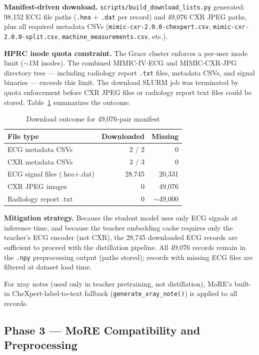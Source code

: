 \documentclass[sigconf,nonacm]{acmart}
\begin{document}
\textbf{Manifest-driven download.}
\texttt{scripts/build\_download\_lists.py} generated:
98,152 ECG file paths (\texttt{.hea} + \texttt{.dat} per record) and
49,076 CXR JPEG paths, plus all required metadata CSVs
(\texttt{mimic-cxr-2.0.0-chexpert.csv}, \texttt{mimic-cxr-2.0.0-split.csv},
\texttt{machine\_measurements.csv}, etc.).

\textbf{HPRC inode quota constraint.}
The Grace cluster enforces a per-user inode limit ($\sim$1M inodes).
The combined MIMIC-IV-ECG and MIMIC-CXR-JPG directory tree — including
radiology report \texttt{.txt} files, metadata CSVs, and signal binaries
— exceeds this limit. The download SLURM job was terminated by quota
enforcement before CXR JPEG files or radiology report text files could be
stored. Table~\ref{tab:download} summarizes the outcome.

\begin{table}[h]
\caption{Download outcome for 49,076-pair manifest}
\label{tab:download}
\begin{tabular}{lrr}
\toprule
File type & Downloaded & Missing \\
\midrule
ECG metadata CSVs & 2 / 2 & 0 \\
CXR metadata CSVs & 3 / 3 & 0 \\
ECG signal files (.hea+.dat) & 28,745 & 20,331 \\
CXR JPEG images & 0 & 49,076 \\
Radiology report .txt & 0 & $\sim$49,000 \\
\bottomrule
\end{tabular}
\end{table}

\textbf{Mitigation strategy.}
Because the student model uses only ECG signals at inference time, and
because the teacher embedding cache requires only the teacher's ECG
encoder (not CXR), the 28,745 downloaded ECG records are sufficient to
proceed with the distillation pipeline. All 49,076 records remain in
the \texttt{.npy} preprocessing output (paths stored); records with
missing ECG files are filtered at dataset load time.

For xray notes (used only in teacher pretraining, not distillation),
MoRE's built-in CheXpert-label-to-text fallback
(\texttt{generate\_xray\_note()}) is applied to all records.

\subsection{Phase 3 — MoRE Compatibility and Preprocessing}
\end{document}
